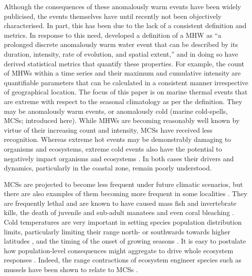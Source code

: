 \documentclass[a4paper,10pt,review]{elsarticle}
\begin{document}
Although the consequences of these anomalously warm events have been widely publicised, the events themselves have until recently not been objectively characterised. In part, this has been due to the lack of a consistent definition and metrics. In response to this need, \citet{Hobday2016} developed a definition of a MHW as ``a prolonged discrete anomalously warm water event that can be described by its duration, intensity, rate of evolution, and spatial extent,'' and in doing so have derived statistical metrics that quantify these properties. For example, the count of MHWs within a time series and their maximum and cumulative intensity are quantifiable parameters that can be calculated in a consistent manner irrespective of geographical location. The focus of this paper is on marine thermal events that are extreme with respect to the seasonal climatology as per the \citet{Hobday2016} definition. They may be anomalously warm events, or anomalously cold (marine cold-spells, MCSs; introduced here). While MHWs are becoming reasonably well known by virtue of their increasing count and intensity, MCSs have received less recognition. Whereas extreme hot events may be demonstrably damaging to organisms and ecosystems, extreme cold events also have the potential to negatively impact organisms and ecosystems \citep{Lirman2011}. In both cases their drivers and dynamics, particularly in the coastal zone, remain poorly understood.

MCSs are projected to become less frequent under future climatic scenarios, but there are also examples of them becoming more frequent in some localities \citep[e.g.][]{Gershunov2008, Matthes2015}. They are frequently lethal \citep{Woodward1987} and are known to have caused mass fish \citep{Gunter1941, Gunter1951, Holt1983} and invertebrate \citep{Gunter1951, Crisp1964} kills, the death of juvenile and sub-adult manatees \citep{OShea1985, Marsh1986} and even coral bleaching \citep{Lirman2011}. Cold temperatures are very important in setting species population distribution limits, particularly limiting their range north- or southwards towards higher latitudes \citep{Firth2011}, and the timing of the onset of growing seasons \citep{Jentsch2007}. It is easy to postulate how population-level consequences might aggregate to drive whole ecosystem responses \citep[e.g.][]{Kreyling2008, Rehage2016}. Indeed, the range contractions of ecosystem engineer species such as mussels have been shown to relate to MCSs \citep{Firth2011, Firth2015}.
\end{document}
